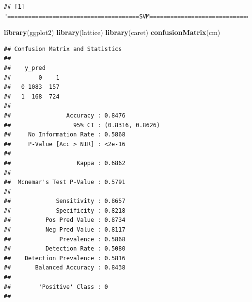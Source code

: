\documentclass[
]{article}
\newenvironment{Shaded}{\begin{snugshade}}{\end{snugshade}}
\newcommand{\KeywordTok}[1]{\textcolor[rgb]{0.13,0.29,0.53}{\textbf{#1}}}
\newcommand{\NormalTok}[1]{#1}
\begin{document}
\begin{verbatim}
## [1] "======================================SVM====================================="
\end{verbatim}

\begin{Shaded}
\begin{Highlighting}[]
\KeywordTok{library}\NormalTok{(ggplot2)}
\KeywordTok{library}\NormalTok{(lattice)}
\KeywordTok{library}\NormalTok{(caret)}
\KeywordTok{confusionMatrix}\NormalTok{(cm)}
\end{Highlighting}
\end{Shaded}

\begin{verbatim}
## Confusion Matrix and Statistics
## 
##    y_pred
##        0    1
##   0 1083  157
##   1  168  724
##                                           
##                Accuracy : 0.8476          
##                  95% CI : (0.8316, 0.8626)
##     No Information Rate : 0.5868          
##     P-Value [Acc > NIR] : <2e-16          
##                                           
##                   Kappa : 0.6862          
##                                           
##  Mcnemar's Test P-Value : 0.5791          
##                                           
##             Sensitivity : 0.8657          
##             Specificity : 0.8218          
##          Pos Pred Value : 0.8734          
##          Neg Pred Value : 0.8117          
##              Prevalence : 0.5868          
##          Detection Rate : 0.5080          
##    Detection Prevalence : 0.5816          
##       Balanced Accuracy : 0.8438          
##                                           
##        'Positive' Class : 0               
## 
\end{verbatim}
\end{document}

